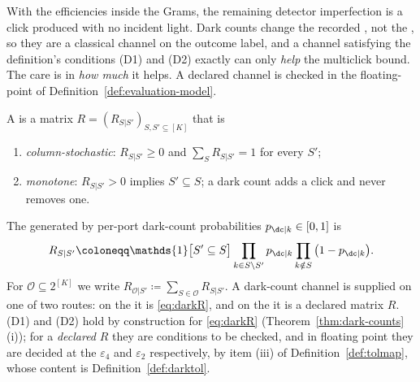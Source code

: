 
With the efficiencies inside the Grams, the remaining detector imperfection is
a click produced with no incident light. Dark counts change the recorded
, not the , so they are a
classical channel on the outcome label, and a channel satisfying the
definition's conditions (D1) and (D2) exactly can only \emph{help} the
multiclick bound. The care is in
\emph{how much} it helps. A declared channel is checked in the floating-point
 of Definition~\ref{def:evaluation-model}.

\begin{definition}\label{def:darkadm}
A 
is a matrix $R=(R_{S|S'})_{S,S'\subseteq[K]}$ that is
\begin{enumerate}[label=(D\arabic*),leftmargin=3.0em]
\item \emph{column-stochastic}: $R_{S|S'}\ge0$ and $\sum_SR_{S|S'}=1$ for every
  $S'$;
\item \emph{monotone}: $R_{S|S'}>0$ implies $S'\subseteq S$; a dark count
  adds a click and never removes one.
\end{enumerate}
The 
generated by per-port dark-count probabilities $p_{\dc|k}\in[0,1]$ is
\begin{equation}\label{eq:darkR}
  R_{S|S'}\coloneqq
  \mathds{1}\big[S'\subseteq S\big]
  \prod_{k\in S\setminus S'}p_{\dc|k}
  \prod_{k\notin S}\big(1-p_{\dc|k}\big).
\end{equation}
For $\mathcal{O}\subseteq2^{[K]}$ we write
$R_{\mathcal{O}|S'}\coloneqq\sum_{S\in\mathcal{O}}R_{S|S'}$.
A dark-count channel is supplied on one of two routes: on the
it is \eqref{eq:darkR}, and on the
it is a declared matrix $R$.
(D1) and (D2) hold by construction for \eqref{eq:darkR}
(Theorem~\ref{thm:dark-counts}\,(i)); for a \emph{declared} $R$ they are conditions to
be checked, and in floating point they are decided at the
 $\varepsilon_4$ and $\varepsilon_2$ respectively, by
item (iii) of Definition~\ref{def:tolmap}, whose content is
Definition~\ref{def:darktol}.
\end{definition}
